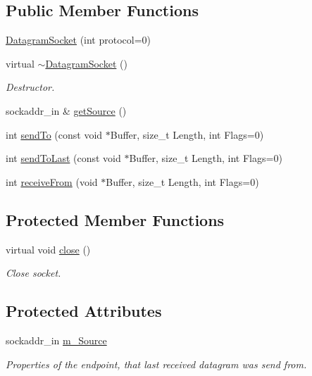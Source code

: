 \subsection*{Public Member Functions}
\begin{DoxyCompactItemize}
\item 
\hyperlink{classDatagramSocket_a154493cb7278a67055b303aed93c4272}{Datagram\+Socket} (int protocol=0)
\item 
virtual \hyperlink{classDatagramSocket_a749202f672a5c649ef1b3efee31cbe64}{$\sim$\+Datagram\+Socket} ()
\begin{DoxyCompactList}\small\item\em Destructor. \end{DoxyCompactList}\item 
sockaddr\+\_\+in \& \hyperlink{classDatagramSocket_a3ab11d022387bea4f04d8bd2385d6560}{get\+Source} ()
\item 
int \hyperlink{classDatagramSocket_a85adaaa4c3a7ecf4259c4608a7d02de4}{send\+To} (const void $\ast$Buffer, size\+\_\+t Length, int Flags=0)
\item 
int \hyperlink{classDatagramSocket_a74cdf74e62415895600df98a5115826a}{send\+To\+Last} (const void $\ast$Buffer, size\+\_\+t Length, int Flags=0)
\item 
int \hyperlink{classDatagramSocket_a0366888764a76a89db65f61795e55c07}{receive\+From} (void $\ast$Buffer, size\+\_\+t Length, int Flags=0)
\end{DoxyCompactItemize}
\subsection*{Protected Member Functions}
\begin{DoxyCompactItemize}
\item 
virtual void \hyperlink{classDatagramSocket_a5c926c1d93a9e1b2e19d73170c4984cb}{close} ()
\begin{DoxyCompactList}\small\item\em Close socket. \end{DoxyCompactList}\end{DoxyCompactItemize}
\subsection*{Protected Attributes}
\begin{DoxyCompactItemize}
\item 
sockaddr\+\_\+in \hyperlink{classDatagramSocket_a1b7784d4356ad11fdb109c44c5b227ab}{m\+\_\+\+Source}
\begin{DoxyCompactList}\small\item\em Properties of the endpoint, that last received datagram was send from. \end{DoxyCompactList}\end{DoxyCompactItemize}
